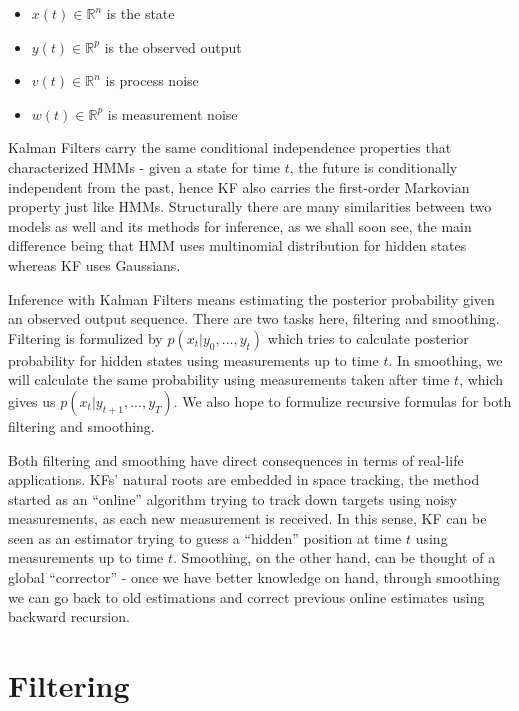 \begin{itemize}
   \item $x(t) \in \mathbb{R}^n$ is the state
   \item $y(t) \in \mathbb{R}^p$ is the observed output
   \item $v(t) \in \mathbb{R}^n$ is process noise
   \item $w(t) \in \mathbb{R}^p$ is measurement noise
\end{itemize}

Kalman Filters carry the same conditional independence properties that
characterized HMMs - given a state for time $t$, the future is conditionally
independent from the past, hence KF also carries the first-order Markovian
property just like HMMs. Structurally there are many similarities between two
models as well and its methods for inference, as we shall soon see, the main
difference being that HMM uses multinomial distribution for hidden states
whereas KF uses Gaussians.

Inference with Kalman Filters means estimating the posterior probability given
an observed output sequence. There are two tasks here, filtering and
smoothing. Filtering is formulized by $p(x_t|y_0,...,y_t)$ which tries to
calculate posterior probability for hidden states using measurements up to time
$t$. In smoothing, we will calculate the same probability using measurements
taken after time $t$, which gives us $p(x_t|y_{t+1},...,y_T)$. We also hope to
formulize recursive formulas for both filtering and smoothing.

Both filtering and smoothing have direct consequences in terms of real-life
applications. KFs' natural roots are embedded in space tracking, the method
started as an ``online'' algorithm trying to track down targets using noisy
measurements, as each new measurement is received. In this sense, KF can be seen
as an estimator trying to guess a ``hidden'' position at time $t$ using
measurements up to time $t$. Smoothing, on the other hand, can be thought of a
global ``corrector'' - once we have better knowledge on hand, through smoothing
we can go back to old estimations and correct previous online estimates using
backward recursion.


\section{Filtering}

